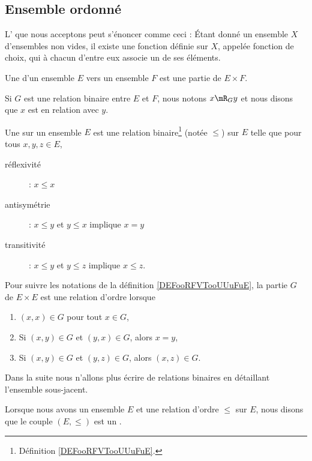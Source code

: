 \subsection{Ensemble ordonné}

\begin{normaltext}\label{NORooLMBYooYjUoju}
	L' que nous acceptons peut s'énoncer comme ceci\cite{ooKLIXooHbpufL} : Étant donné un ensemble \( X\) d'ensembles non vides, il existe une fonction définie sur \( X\), appelée fonction de choix, qui à chacun d'entre eux associe un de ses éléments.
\end{normaltext}

\begin{definition}        \label{DEFooRFVTooUUuFuE}
	Une  d'un ensemble \( E\) vers un ensemble \( F\) est une partie de \( E\times F\).

	Si \( G\) est une relation binaire entre \( E\) et \( F\), nous notons \( x\mR_G y\) et nous disons que \( x\) est en relation avec \( y\).
\end{definition}

\begin{definition}      \label{DefooFLYOooRaGYRk}
	Une  sur un ensemble \( E\) est une relation binaire\footnote{Définition \ref{DEFooRFVTooUUuFuE}.} (notée \( \leq\)) sur \( E\) telle que pour tous \( x,y,z\in E\),
	\begin{description}
		\item[réflexivité] : \( x\leq x\)
		\item[antisymétrie] : \( x\leq y\) et \( y\leq x\) implique \( x=y\)
		\item[transitivité] : \( x\leq y\) et \( y\leq z\) implique \( x\leq z\).
	\end{description}

	Pour suivre les notations de la définition \ref{DEFooRFVTooUUuFuE}, la partie \( G\) de \( E\times E\) est une relation d'ordre lorsque
	\begin{enumerate}
		\item
		      \( (x,x)\in G\) pour tout \( x\in G\),
		\item
		      Si \( (x,y)\in G\) et \( (y,x)\in G\), alors \( x=y\),
		\item
		      Si \( (x,y)\in G\) et \( (y,z)\in G\), alors \( (x,z)\in G\).
	\end{enumerate}
	Dans la suite nous n'allons plus écrire de relations binaires en détaillant l'ensemble sous-jacent.

	Lorsque nous avons un ensemble \( E\) et une relation d'ordre \( \leq\) sur \( E\), nous disons que le couple \( (E,\leq)\) est un .
\end{definition}

